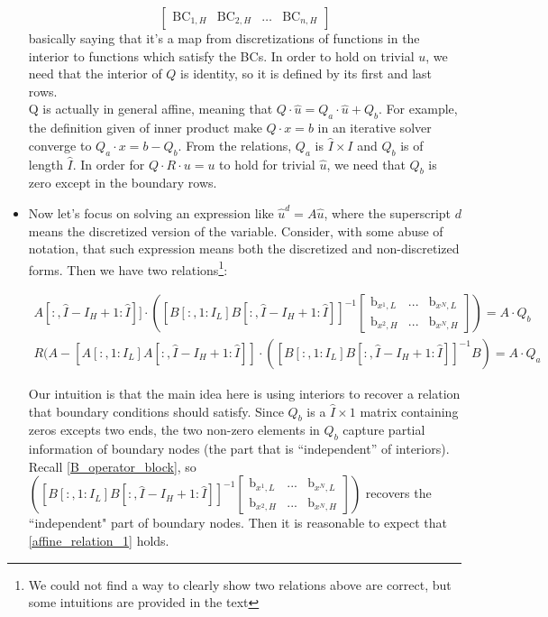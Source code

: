 \documentclass[11pt]{article}
\begin{document}
\begin{itemize}
\begin{equation}
\begin{bmatrix}
		\text{BC}_{1, H}&\text{BC}_{2, H}&\dots&\text{BC}_{n, H}
		\end{bmatrix}\label{Q_operator_2}
		\end{equation}
		basically saying that it's a map from discretizations of functions in the interior to functions which satisfy the BCs. In order to hold on trivial $u$, we need that the interior of $Q$ is identity, so it is defined by its first and last rows.\\
		Q is actually in general affine, meaning that $Q\cdot \hat{u} = Q_a\cdot \hat{u} + Q_b$. For example, the definition given of inner product make $Q\cdot x=b$ in an iterative solver converge to $Q_a\cdot x = b - Q_b$. From the relations, $Q_a$ is $\hat{I}\times I$ and $Q_b$ is of length $\hat{I}$. In order for $Q\cdot R\cdot u = u$ to hold for trivial $\hat{u}$, we need that $Q_b$ is zero except in the boundary rows.
		
		\item Now let's focus on solving an expression like $\hat{u}^d = A \hat{u}$, where the superscript $d$ means the discretized version of the variable. Consider, with some abuse of notation, that such expression means both the discretized and non-discretized forms. Then we have two relations\footnote{We could not find a way to clearly show two relations above are correct, but some intuitions are provided in the text}:
		
		\begin{align}
		[A[:, 1:I_L] A[:,\hat{I}-I_H+1:\hat{I}]]\cdot\left([B[:,1:I_L] B[:,\hat{I}-I_H+1:\hat{I}]]^{-1}\begin{bmatrix}
		\text{b}_{x^{1},L} & ... & \text{b}_{x^{N},L}\\
		\text{b}_{x^{2},H} & ... & \text{b}_{x^{N},H}
		\end{bmatrix}\right) = A\cdot Q_b\label{affine_relation_1}\\
		R(A-[A[:,1:I_L] A[:,\hat{I}-I_H+1:\hat{I}]]\cdot([B[:,1:I_L] B[:,\hat{I}-I_H+1:\hat{I}]]^{-1} B) = A\cdot Q_a\label{affine_relation_2}
		\end{align}
		
		Our intuition is that the main idea here is using interiors to recover a relation that boundary conditions should satisfy. Since $Q_b$ is a $\hat{I}\times 1$ matrix containing zeros excepts two ends, the two non-zero elements in $Q_b$ capture partial information of boundary nodes (the part that is ``independent'' of interiors).  Recall \eqref{B_operator_block}, so $\left([B[:,1:I_L] B[:,\hat{I}-I_H+1:\hat{I}]]^{-1}\begin{bmatrix}
		\text{b}_{x^{1},L} & ... & \text{b}_{x^{N},L}\\
		\text{b}_{x^{2},H} & ... & \text{b}_{x^{N},H}
		\end{bmatrix}\right)$ recovers the ``independent" part of boundary nodes. Then it is reasonable to expect that \eqref{affine_relation_1} holds.
		

\end{itemize}
\end{document}
